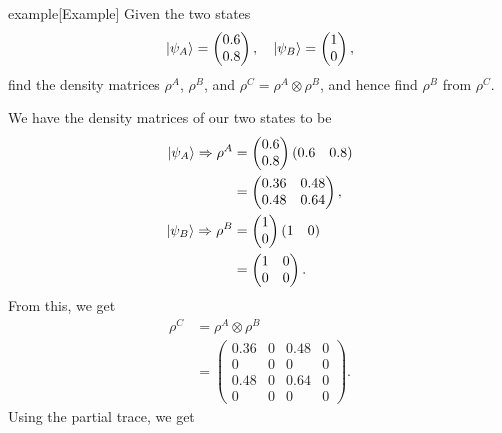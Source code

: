\documentclass{article}
\begin{document}
\begin{callout}{example}[Example]
\label{example:s8-e1}
Given the two states 
\[
    \ket{\psi _A}=\begin{pmatrix}
        0.6\\0.8
    \end{pmatrix},\quad \ket{\psi _B}=\begin{pmatrix}
        1\\0
    \end{pmatrix},
\]
find the density matrices $\rho ^A$, $\rho ^B$, and $\rho ^C=\rho ^A\otimes \rho ^B$, and hence find $\rho ^B$ from $\rho ^C$.

We have the density matrices of our two states to be
\begin{align*}
    \ket{\psi _A}\Rightarrow\rho ^A &=\begin{pmatrix}
        0.6\\0.8
    \end{pmatrix}\left( 0.6\quad 0.8 \right)\\
                                    &=\begin{pmatrix}
                                        0.36&0.48\\0.48&0.64
                                    \end{pmatrix},\\
        \ket{\psi _B}\Rightarrow\rho ^B&=\begin{pmatrix}
            1\\0
        \end{pmatrix}(1\quad 0)  \\
                                       &=\begin{pmatrix}
                                           1&0\\0&0
                                       \end{pmatrix}.
\end{align*}
From this, we get
\begin{align*}
    \rho ^C &= \rho ^A\otimes \rho ^B \\
            &=\begin{pmatrix}
                0.36&0&0.48&0\\
                0&0&0&0\\
                0.48&0&0.64&0\\
                0&0&0&0
            \end{pmatrix}.
\end{align*}
Using the partial trace, we get
\begin{align*}

\end{align*}
\end{callout}
\end{document}
